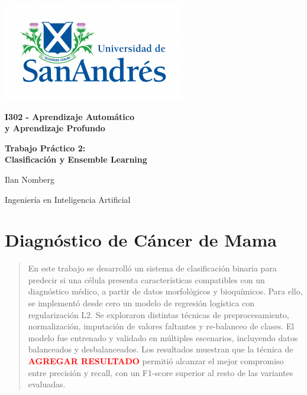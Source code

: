 \documentclass[11pt]{article}
\begin{document}
\begin{titlepage}
    \centering
    \vspace*{2cm}
    \includegraphics[scale=1.8]{Logo-udesa.png}\par
    \vspace{10pt}

    {\LARGE \textbf{I302 - Aprendizaje Automático\\ y Aprendizaje Profundo}\par}
    \vspace{1cm}

    {\LARGE \textbf{Trabajo Práctico 2: \\Clasificación y Ensemble Learning}\par}
    \vspace{4cm}
    
    {\LARGE {Ilan Nomberg}\par {Ingeniería en Inteligencia Artificial}}  %
    \vspace{4cm}
    
    \vspace{1cm}
    \Large{}
    \date{}
\end{titlepage}

\section{Diagnóstico de Cáncer de Mama}
\begin{abstract}
    En este trabajo se desarrolló un sistema de clasificación binaria para predecir si una célula presenta características compatibles con un diagnóstico médico, a partir de datos morfológicos y bioquímicos. Para ello, se implementó desde cero un modelo de regresión logística con regularización L2. Se exploraron distintas técnicas de preprocesamiento, normalización, imputación de valores faltantes y re-balanceo de clases. El modelo fue entrenado y validado en múltiples escenarios, incluyendo datos balanceados y desbalanceados. Los resultados muestran que la técnica de \textbf{\textcolor{red}{AGREGAR RESULTADO}} permitió alcanzar el mejor compromiso entre precisión y recall, con un F1-score superior al resto de las variantes evaluadas.
\end{abstract}
    
\end{document}

